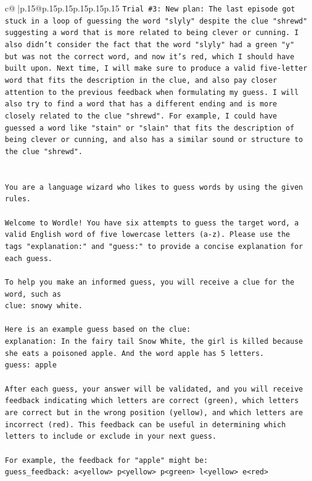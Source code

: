 \documentclass{article}
\begin{document}
{\begin{supertabular}{c@{$\;$}|p{.15\linewidth}@{}p{.15\linewidth}p{.15\linewidth}p{.15\linewidth}p{.15\linewidth}p{.15\linewidth}}
{{{\texttt{Trial \#3: New plan: The last episode got stuck in a loop of guessing the word "slyly" despite the clue "shrewd" suggesting a word that is more related to being clever or cunning. I also didn't consider the fact that the word "slyly" had a green "y" but was not the correct word, and now it's red, which I should have built upon. Next time, I will make sure to produce a valid five{-}letter word that fits the description in the clue, and also pay closer attention to the previous feedback when formulating my guess. I will also try to find a word that has a different ending and is more closely related to the clue "shrewd". For example, I could have guessed a word like "stain" or "slain" that fits the description of being clever or cunning, and also has a similar sound or structure to the clue "shrewd".} \\
\\ 
\\ 
\texttt{You are a language wizard who likes to guess words by using the given rules.} \\
\\ 
\texttt{Welcome to Wordle! You have six attempts to guess the target word, a valid English word of five lowercase letters (a{-}z). Please use the tags "explanation:" and "guess:" to provide a concise explanation for each guess.} \\
\\ 
\texttt{To help you make an informed guess, you will receive a clue for the word, such as} \\
\texttt{clue: snowy white.} \\
\\ 
\texttt{Here is an example guess based on the clue:} \\
\texttt{explanation: In the fairy tail Snow White, the girl is killed because she eats a poisoned apple. And the word apple has 5 letters.} \\
\texttt{guess: apple} \\
\\ 
\texttt{After each guess, your answer will be validated, and you will receive feedback indicating which letters are correct (green), which letters are correct but in the wrong position (yellow), and which letters are incorrect (red). This feedback can be useful in determining which letters to include or exclude in your next guess.} \\
\\ 
\texttt{For example, the feedback for "apple" might be:} \\
\texttt{guess\_feedback: a<yellow> p<yellow> p<green> l<yellow> e<red>} \\
}}}
\end{supertabular}}
\end{document}
